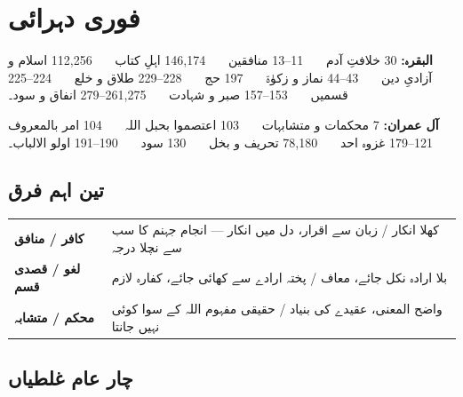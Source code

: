 
\section*{فوری دہرائی}

\begin{nukta}
\textbf{البقرہ:} \textenglish{30} خلافتِ آدم \ \textbullet\ \
\textenglish{11--13} منافقین \ \textbullet\ \ \textenglish{146,174}
اہلِ کتاب \ \textbullet\ \ \textenglish{112,256} اسلام و آزادیِ دین \
\textbullet\ \ \textenglish{43--44} نماز و زکوٰۃ \ \textbullet\ \
\textenglish{197} حج \ \textbullet\ \ \textenglish{228--229} طلاق و خلع \
\textbullet\ \ \textenglish{224--225} قسمیں \ \textbullet\ \
\textenglish{153--157} صبر و شہادت \ \textbullet\ \
\textenglish{261,275--279} انفاق و سود۔

\smallskip
\textbf{آل عمران:} \textenglish{7} محکمات و متشابہات \ \textbullet\ \
\textenglish{103} اعتصموا بحبل اللہ \ \textbullet\ \ \textenglish{104} امر
بالمعروف \ \textbullet\ \ \textenglish{121--179} غزوہ احد \ \textbullet\ \
\textenglish{78,180} تحریف و بخل \ \textbullet\ \ \textenglish{130} سود \
\textbullet\ \ \textenglish{190--191} اولو الالباب۔
\end{nukta}

\medskip
\subsection*{تین اہم فرق}

\begin{center}
\begin{tabular}{@{}p{3.6cm} p{10.8cm}@{}}
\toprule
\textbf{کافر / منافق} & کھلا انکار / زبان سے اقرار، دل میں انکار --- انجام
  جہنم کا سب سے نچلا درجہ \\
\textbf{لغو / قصدی قسم} & بلا ارادہ نکل جائے، معاف / پختہ ارادے سے کھائی
  جائے، کفارہ لازم \\
\textbf{محکم / متشابہ} & واضح المعنی، عقیدے کی بنیاد / حقیقی مفہوم اللہ کے
  سوا کوئی نہیں جانتا \\
\bottomrule
\end{tabular}
\end{center}

\medskip
\subsection*{چار عام غلطیاں}

